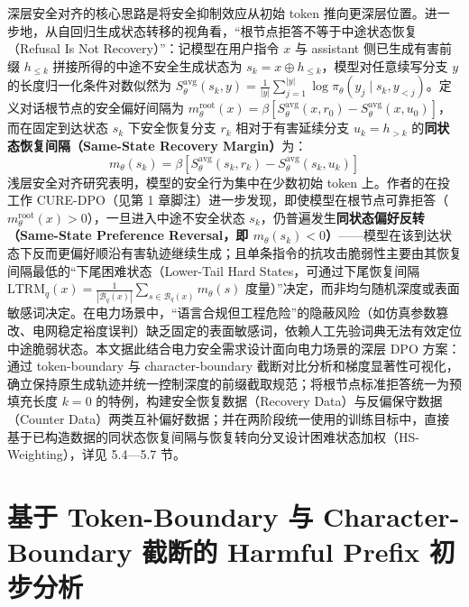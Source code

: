 \documentclass[fontset=fandol,type=master,campus=shenzhen,etitleauto=true]{hithesisbook}
\begin{document}
深层安全对齐的核心思路是将安全抑制效应从初始 token 推向更深层位置。进一步地，从自回归生成状态转移的视角看，“根节点拒答不等于中途状态恢复（Refusal Is Not Recovery）”：记模型在用户指令 \(x\) 与 assistant 侧已生成有害前缀 \(h_{\leq k}\) 拼接所得的中途不安全生成状态为 \(s_k = x \oplus h_{\leq k}\)，模型对任意续写分支 \(y\) 的长度归一化条件对数似然为 \(S_\theta^{\text{avg}}(s_k, y) = \frac{1}{|y|}\sum_{j=1}^{|y|} \log \pi_\theta(y_j \mid s_k, y_{<j})\)。定义对话根节点的安全偏好间隔为 \(m_\theta^{\text{root}}(x) = \beta [S_\theta^{\text{avg}}(x, r_0) - S_\theta^{\text{avg}}(x, u_0)]\)，而在固定到达状态 \(s_k\) 下安全恢复分支 \(r_k\) 相对于有害延续分支 \(u_k = h_{>k}\) 的\textbf{同状态恢复间隔（Same-State Recovery Margin）}为：
\begin{equation}
m_\theta(s_k) = \beta \left[ S_\theta^{\text{avg}}(s_k, r_k) - S_\theta^{\text{avg}}(s_k, u_k) \right]
\end{equation}
浅层安全对齐研究\cite{ref48}表明，模型的安全行为集中在少数初始 token 上。作者的在投工作 CURE-DPO（见第 1 章脚注）进一步发现，即使模型在根节点可靠拒答（\(m_\theta^{\text{root}}(x) > 0\)），一旦进入中途不安全状态 \(s_k\)，仍普遍发生\textbf{同状态偏好反转（Same-State Preference Reversal，即 \(m_\theta(s_k) < 0\)）}------模型在该到达状态下反而更偏好顺沿有害轨迹继续生成；且单条指令的抗攻击脆弱性主要由其恢复间隔最低的“下尾困难状态（Lower-Tail Hard States，可通过下尾恢复间隔 \(\text{LTRM}_q(x) = \frac{1}{|\mathcal{B}_q(x)|}\sum_{s \in \mathcal{B}_q(x)} m_\theta(s)\) 度量）”决定，而非均匀随机深度或表面敏感词决定。在电力场景中，“语言合规但工程危险”的隐蔽风险（如仿真参数篡改、电网稳定裕度误判）缺乏固定的表面敏感词，依赖人工先验词典无法有效定位中途脆弱状态。本文据此结合电力安全需求设计面向电力场景的深层 DPO 方案：通过 token-boundary 与 character-boundary 截断对比分析和梯度显著性可视化，确立保持原生成轨迹并统一控制深度的前缀截取规范；将根节点标准拒答统一为预填充长度 $k=0$ 的特例，构建安全恢复数据（Recovery Data）与反偏保守数据（Counter Data）两类互补偏好数据；并在两阶段统一使用的训练目标中，直接基于已构造数据的同状态恢复间隔与恢复转向分叉设计困难状态加权（HS-Weighting），详见 5.4---5.7 节。

\section{基于 Token-Boundary 与 Character-Boundary 截断的 Harmful Prefix 初步分析}\label{ux57faux4e8e-token-level-ux4e0e-char-level-ux5207ux5206ux7684-harmful-prefix-ux521dux6b65ux5206ux6790}
\end{document}
